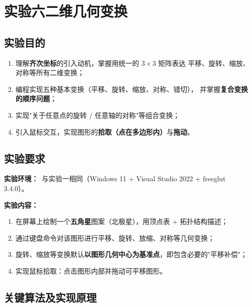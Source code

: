 \documentclass[a4paper,12pt]{ctexart}
\begin{document}
\clearpage
\section{实验六\quad 二维几何变换}

\subsection{实验目的}

\begin{enumerate}[leftmargin=2em,itemsep=0.2em]
    \item 理解\textbf{齐次坐标}的引入动机，掌握用统一的 $3\times 3$ 矩阵表达
        平移、旋转、缩放、对称等所有二维变换；
    \item 编程实现五种基本变换（平移、旋转、缩放、对称、错切），
        并掌握\textbf{复合变换的顺序问题}；
    \item 实现"关于任意点的旋转 / 任意轴的对称"等组合变换；
    \item 引入鼠标交互，实现图形的\textbf{拾取（点在多边形内）}与\textbf{拖动}。
\end{enumerate}

\subsection{实验要求}

\textbf{实验环境：}\ 与实验一相同（Windows 11 + Visual Studio 2022 + freeglut 3.4.0）。

\textbf{实验内容：}
\begin{enumerate}[leftmargin=2em,itemsep=0.2em]
    \item 在屏幕上绘制一个\textbf{五角星}图案（北极星），用顶点表 + 拓扑结构描述；
    \item 通过键盘命令对该图形进行平移、旋转、放缩、对称等几何变换；
    \item 旋转、缩放等变换默认\textbf{以图形几何中心为基准点}，即包含必要的"平移补偿"；
    \item 实现鼠标拾取：点击图形内部并拖动可平移图形。
\end{enumerate}

\subsection{关键算法及实现原理}
\end{document}
